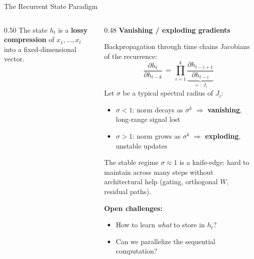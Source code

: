 \begin{frame}{The Recurrent State Paradigm}
\begin{columns}[T]
\begin{column}{0.50\textwidth}
      \vspace{0.2em}
      The state $h_t$ is a \textbf{lossy compression} of $x_1, \ldots, x_t$ into a fixed-dimensional vector.
    \end{column}
    \begin{column}{0.48\textwidth}
      \textbf{Vanishing / exploding gradients}

      Backpropagation through time chains Jacobians of the recurrence:
      \[
        \frac{\partial h_t}{\partial h_{t-k}} \,=\, \prod_{i=1}^{k} \underbrace{\frac{\partial h_{t-i+1}}{\partial h_{t-i}}}_{=:\, J_i}
      \]
      Let $\sigma$ be a typical spectral radius of $J_i$:
      \begin{itemize}
        \item $\sigma < 1$: norm decays as $\sigma^k$ $\Rightarrow$ \textbf{vanishing}, long-range signal lost
        \item $\sigma > 1$: norm grows as $\sigma^k$ $\Rightarrow$ \textbf{exploding}, unstable updates
      \end{itemize}
      The stable regime $\sigma \approx 1$ is a knife-edge: hard to maintain across many steps without architectural help (gating, orthogonal $W$, residual paths).

      \vspace{0.3em}
      \textbf{Open challenges:}
      \begin{itemize}
        \item How to learn \emph{what} to store in $h_t$?
        \item Can we parallelize the sequential computation?
      \end{itemize}
    \end{column}
  \end{columns}
\end{frame}

